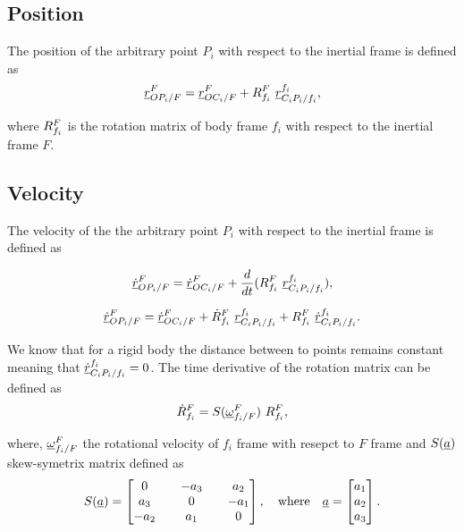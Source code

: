 \subsection{Position}
The position of the arbitrary point $P_{i}$ with respect to the inertial frame 
is defined as
\begin{equation}    
    \pvec{r}{OP_{i}}{F}{F} = \pvec{r}{OC_{i}}{F}{F} + \rot{R}{f_{i}}{F} \  \pvec{r}{C_{i}P_{i}}{f_i}{f_i},
    \label{eq:position_rigid_body}
\end{equation}

where $\rot{R}{f_{i}}{F}$ is the rotation matrix of body frame $f_{i}$ with respect to 
the inertial frame $F$.

\subsection{Velocity}
The velocity of the the arbitrary point $P_{i}$ with respect to the inertial frame 
is defined as

\[
    \pvec{\dot{r}}{OP_{i}}{F}{F} = \pvec{\dot{r}}{OC_{i}}{F}{F} + 
    \frac{d}{dt}(\rot{R}{f_{i}}{F} \  \pvec{r}{C_{i}P_{i}}{f_i}{f_i}),
\]

\begin{equation}
    \pvec{\dot{r}}{OP_{i}}{F}{F} = \pvec{\dot{r}}{OC_{i}}{F}{F} + 
    \rot{\dot{R}}{f_{i}}{F} \  \pvec{r}{C_{i}P_{i}}{f_i}{f_i} + 
    \rot{R}{f_{i}}{F} \  \pvec{\dot{r}}{C_{i}P_{i}}{f_i}{f_i}.
    \label{eq:velocity_general}
\end{equation}

We know that for a rigid body the distance between to points remains constant 
meaning that $\pvec{\dot{r}}{C_{i}P_{i}}{f_i}{f_i} = 0$. The time derivative of 
the rotation matrix can be defined as 
\begin{equation}
    \rot{\dot{R}}{f_{i}}{F} = S(\pvec{\omega}{f_{i}}{F}{F}) \ \rot{R}{f_{i}}{F},
    \label{eq:rot_mat_derivative}
\end{equation}

where, $\pvec{\omega}{f_{i}}{F}{F}$ the rotational velocity of $f_{i}$ frame 
with resepct to $F$ frame and $S(\vecd{a})$ skew-symetrix matrix defined as 
\[
    S(\vecd{a}) = \begin{bmatrix}
        0 && -a_{3} && a_{2} \\
        a_{3} && 0 && -a_{1} \\ 
        -a_{2} && a_{1} && 0 \\ 
    \end{bmatrix}, \quad \text{where} \quad \vecd{a} = \begin{bmatrix}
        a_{1} \\ a_{2} \\ a_{3}
    \end{bmatrix}.
\]

